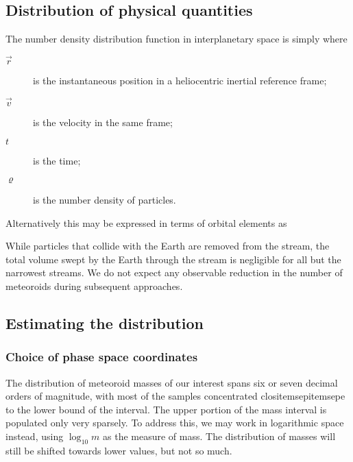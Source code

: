     \subsection{Distribution of physical quantities} \label{mod}
        The number density distribution function in interplanetary space is simply
        where
        \begin{description}
            \item[$\vec{r}$]    is the instantaneous position in a heliocentric inertial reference frame;
            \item[$\vec{v}$]    is the velocity in the same frame;
            \item[$t$]          is the time;
            \item[$\varrho$]    is the number density of particles.
        \end{description}

        Alternatively this may be expressed in terms of orbital elements as

        While particles that collide with the Earth are removed from the stream,
        the total volume swept by the Earth through the stream is negligible for all but the narrowest streams.
        We do not expect any observable reduction in the number of meteoroids during subsequent approaches.

        \subsection{Estimating the distribution} \label{moe}

            \subsubsection{Choice of phase space coordinates} \label{modc}
                The distribution of meteoroid masses of our interest spans six or seven decimal orders of magnitude,
                with most of the samples concentrated clositemsepitemsepe to the lower bound of the interval.
                The upper portion of the mass interval is populated only very sparsely.
                To address this, we may work in logarithmic space instead, using $\log_{10} m$ as the measure of mass.
                The distribution of masses will still be shifted towards lower values, but not so much.


